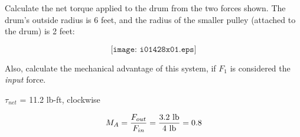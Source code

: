 

Calculate the net torque applied to the drum from the two forces shown.  The drum's outside radius is 6 feet, and the radius of the smaller pulley (attached to the drum) is 2 feet:

$$\texttt{[image: i01428x01.eps]}$$

Also, calculate the mechanical advantage of this system, if $F_1$ is considered the {\it input} force.







$\tau_{net}$ = 11.2 lb-ft, clockwise
 
\vskip 10pt

$$M_A = {F_{out} \over F_{in}} = {3.2 \hbox{ lb} \over 4 \hbox{ lb}} = 0.8$$










